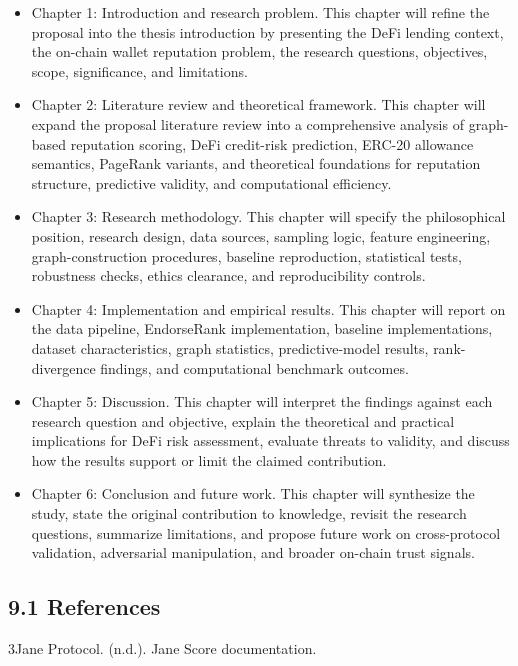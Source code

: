 \documentclass[12pt]{article}
\begin{document}
\begin{itemize}
\item[\textendash] Chapter 1: Introduction and research problem. This chapter will refine the proposal into the thesis introduction by presenting the DeFi lending context, the on-chain wallet reputation problem, the research questions, objectives, scope, significance, and limitations.
\item[\textendash] Chapter 2: Literature review and theoretical framework. This chapter will expand the proposal literature review into a comprehensive analysis of graph-based reputation scoring, DeFi credit-risk prediction, ERC-20 allowance semantics, PageRank variants, and theoretical foundations for reputation structure, predictive validity, and computational efficiency.
\item[\textendash] Chapter 3: Research methodology. This chapter will specify the philosophical position, research design, data sources, sampling logic, feature engineering, graph-construction procedures, baseline reproduction, statistical tests, robustness checks, ethics clearance, and reproducibility controls.
\item[\textendash] Chapter 4: Implementation and empirical results. This chapter will report on the data pipeline, EndorseRank implementation, baseline implementations, dataset characteristics, graph statistics, predictive-model results, rank-divergence findings, and computational benchmark outcomes.
\item[\textendash] Chapter 5: Discussion. This chapter will interpret the findings against each research question and objective, explain the theoretical and practical implications for DeFi risk assessment, evaluate threats to validity, and discuss how the results support or limit the claimed contribution.
\item[\textendash] Chapter 6: Conclusion and future work. This chapter will synthesize the study, state the original contribution to knowledge, revisit the research questions, summarize limitations, and propose future work on cross-protocol validation, adversarial manipulation, and broader on-chain trust signals.
\end{itemize}
\subsection*{9.1 References}
\label{sec:references}

\hangindent=0.5in  3Jane Protocol. (n.d.). Jane Score documentation.\par
\end{document}
